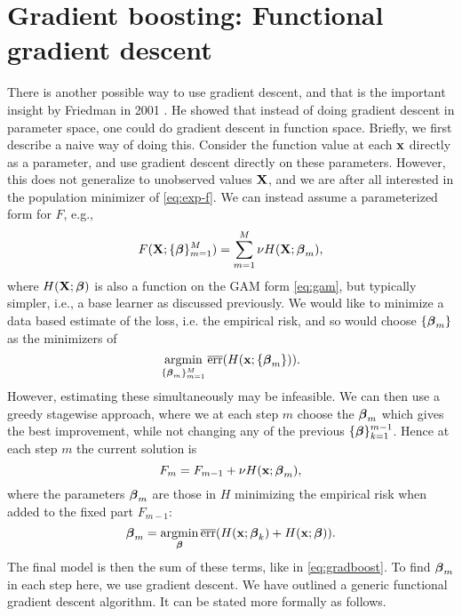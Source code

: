 \section{Gradient boosting: Functional gradient descent}
There is another possible way to use gradient descent, and that is the important insight by Friedman in 2001 \citep{friedman2001}. He showed that instead of doing gradient descent in parameter space, one could do gradient descent in function space. Briefly, we first describe a naive way of doing this. Consider the function value at each $\mathbf{x}$ directly as a parameter, and use gradient descent directly on these parameters. However, this does not generalize to unobserved values $\mathbf{X}$, and we are after all interested in the population minimizer of \eqref{eq:exp-f}. We can instead assume a parameterized form for $F$, e.g.,
\begin{equation}\label{eq:gradboost}
    F(\mathbf{X};\{\boldsymbol{\beta}\}_{m=1}^M)=\sum_{m=1}^M\nu H(\mathbf{X};\boldsymbol{\beta}_m),
\end{equation}
where $H(\mathbf{X};\boldsymbol{\beta})$ is also a function on the GAM form \eqref{eq:gam}, but typically simpler, i.e., a base learner as discussed previously. We would like to minimize a data based estimate of the loss, i.e. the empirical risk, and so would choose $\{\boldsymbol{\beta}_m\}$ as the minimizers of 
\begin{equation*}
    \operatorname*{argmin}_{\{\boldsymbol{\beta}_m\}_{m=1}^M}\overline{\text{err}}(H(\mathbf{x};\{\boldsymbol{\beta}_m\})).
\end{equation*}
However, estimating these simultaneously may be infeasible. We can then use a greedy stagewise approach, where we at each step $m$ choose the $\boldsymbol{\beta}_m$ which gives the best improvement, while not changing any of the previous $\{\boldsymbol{\beta}\}_{k=1}^{m-1}$. Hence at each step $m$ the current solution is
\begin{equation*}
    F_{m}=F_{m-1}+\nu H(\mathbf{x};\boldsymbol{\beta}_m),
\end{equation*}
where the parameters $\boldsymbol{\beta}_m$ are those in $H$ minimizing the empirical risk when added to the fixed part $F_{m-1}$:
\begin{equation*}
    \boldsymbol{\beta}_m=\operatorname*{argmin}_{\boldsymbol{\beta}}\overline{\text{err}}(H(\mathbf{x};\boldsymbol{\beta}_k)+H(\mathbf{x};\boldsymbol{\beta})).
\end{equation*}
The final model is then the sum of these terms, like in \eqref{eq:gradboost}. To find $\boldsymbol{\beta}_m$ in each step here, we use gradient descent. We have outlined a generic functional gradient descent algorithm. It can be stated more formally as follows.
